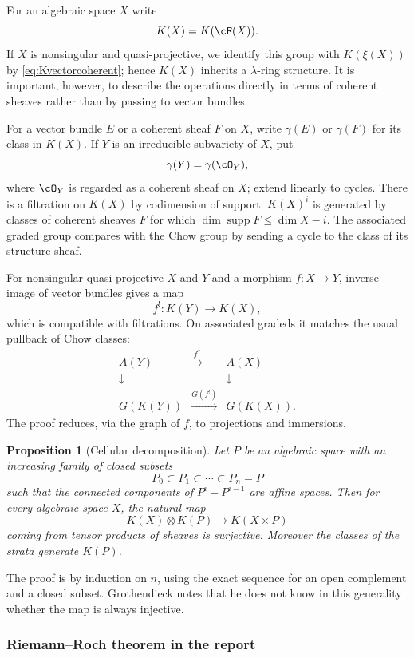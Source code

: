 \documentclass[11pt]{article}
\theoremstyle{plain}
\newtheorem*{proposition*}{Proposition}
\theoremstyle{definition}
\theoremstyle{remark}
\DeclareMathOperator{\supp}{supp}
\begin{document}
For an algebraic space $X$ write
\[
   K(X)=K(\cF(X)).
\]
If $X$ is nonsingular and quasi-projective, we identify this group with $K(\xi(X))$ by \eqref{eq:Kvectorcoherent}; hence $K(X)$ inherits a $\lambda$-ring structure. It is important, however, to describe the operations directly in terms of coherent sheaves rather than by passing to vector bundles.

For a vector bundle $E$ or a coherent sheaf $F$ on $X$, write $\gamma(E)$ or $\gamma(F)$ for its class in $K(X)$. If $Y$ is an irreducible subvariety of $X$, put
\[
   \gamma(Y)=\gamma(\cO_Y),
\]
where $\cO_Y$ is regarded as a coherent sheaf on $X$; extend linearly to cycles. There is a filtration on $K(X)$ by codimension of support: $K(X)^i$ is generated by classes of coherent sheaves $F$ for which $\dim\supp F\leq \dim X-i$. The associated graded group compares with the Chow group by sending a cycle to the class of its structure sheaf.

For nonsingular quasi-projective $X$ and $Y$ and a morphism $f:X\to Y$, inverse image of vector bundles gives a map
\[
   f^!:K(Y)\to K(X),
\]
which is compatible with filtrations. On associated gradeds it matches the usual pullback of Chow classes:
\[
\begin{array}{ccc}
A(Y) & \xrightarrow{f^*} & A(X) \\
\downarrow & & \downarrow \\
G(K(Y)) & \xrightarrow{G(f^!)} & G(K(X)).
\end{array}
\]
The proof reduces, via the graph of $f$, to projections and immersions.

\begin{proposition*}[Cellular decomposition]
Let $P$ be an algebraic space with an increasing family of closed subsets
\[
P_0\subset P_1\subset\cdots\subset P_n=P
\]
such that the connected components of $P^i-P^{i-1}$ are affine spaces. Then for every algebraic space $X$, the natural map
\[
   K(X)\otimes K(P)\to K(X\times P)
\]
coming from tensor products of sheaves is surjective. Moreover the classes of the strata generate $K(P)$.
\end{proposition*}

The proof is by induction on $n$, using the exact sequence for an open complement and a closed subset. Grothendieck notes that he does not know in this generality whether the map is always injective.

\subsubsection{Riemann--Roch theorem in the report}
\end{document}
